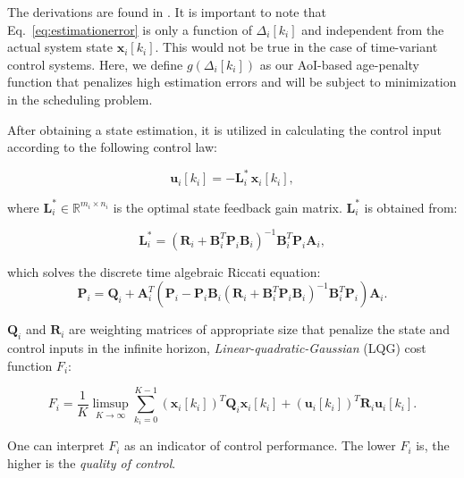 The derivations are found in \cite{ayan2019age}. It is important to note that
Eq.~\eqref{eq:estimationerror} is only a function of $\Delta_i[k_i]$ and
independent from the actual system state $\boldsymbol{x}_i[k_i]$. This would not
be true in the case of time-variant control systems. Here, we define
$g(\Delta_i[k_i])$ as our AoI-based age-penalty function that penalizes high
estimation errors and will be subject to minimization in the scheduling problem.

After obtaining a state estimation, it is utilized in calculating the control
input according to the following control law:

\begin{equation}
  \label{eq:controllaw}
  \boldsymbol{u}_i[k_i] = - \boldsymbol{L}_i^* \,\boldsymbol{\hat{x}}_i[k_i],
\end{equation}

where $\boldsymbol{L}_i^* \in \mathbb{R}^{m_i \times n_i}$ is the optimal state
feedback gain matrix. $\boldsymbol{L}^*_i$ is obtained from:

\begin{equation}
  \label{eq:optimalgain}
  \boldsymbol{L}_i^* = \left(\boldsymbol{R}_i + \boldsymbol{B}_i^T \boldsymbol{P}_i \boldsymbol{B}_i \right)^{-1} \boldsymbol{B}_i^T \boldsymbol{P}_i \boldsymbol{A}_i,
\end{equation}

which solves the discrete time algebraic Riccati equation:
\begin{equation}
  \label{eq:riccati}
  \boldsymbol{P}_i = \boldsymbol{Q}_{i} + \boldsymbol{A}_i^T \left(\boldsymbol{P}_i - \boldsymbol{P}_i \boldsymbol{B}_i ( \boldsymbol{R}_{i} + \boldsymbol{B}_i^T \boldsymbol{P}_i \boldsymbol{B}_i)^{- 1} \boldsymbol{B}_i^T \boldsymbol{P}_i \right) \boldsymbol{A}_i.
\end{equation}

$\boldsymbol{Q}_{i}$ and $\boldsymbol{R}_{i}$ are weighting matrices of
appropriate size that penalize the state and control inputs in the infinite
horizon, \textit{Linear-quadratic-Gaussian} (LQG) cost function $F_i$:

\begin{equation}
  F_i = \dfrac{1}{K} \limsup_{K \rightarrow \infty} \sum_{k_i=0}^{K-1} (\boldsymbol{x}_i[k_i])^T \boldsymbol{Q}_i \boldsymbol{x}_i[k_i] +  (\boldsymbol{u}_i[k_i])^T \boldsymbol{R}_i \boldsymbol{u}_i[k_i]. 
\end{equation}

One can interpret $F_i$ as an indicator of control performance. The lower $F_i$
is, the higher is the \textit{quality of control}.

